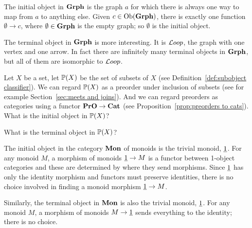\documentclass[CT4S-EN-RU]{subfiles}
\begin{document}
\begin{exampleRUS}\label{ex:universal obs in set}
\end{exampleRUS}

\begin{exampleENG}
The initial object in ${\mathbf{Grph}}$ is the graph $a$ for which there is always one way to map from $a$ to anything else. Given $c\in\textnormal{Ob}({\mathbf{Grph}})$, there is exactly one function $\emptyset\to c$, where $\emptyset\in{\mathbf{Grph}}$ is the empty graph; so $\emptyset$ is the initial object.

The terminal object in ${\mathbf{Grph}}$ is more interesting. It is ${\mathcal{L} oop}$, the graph with one vertex and one arrow. In fact there are infinitely many terminal objects in ${\mathbf{Grph}}$, but all of them are isomorphic to ${\mathcal{L} oop}$. 
\end{exampleENG}

\begin{exampleRUS}
\end{exampleRUS}

\begin{exerciseENG}
Let $X$ be a set, let ${\mathbb P}(X)$ be the set of subsets of $X$ (see Definition~\ref{def:subobject classifier}). We can regard ${\mathbb P}(X)$ as a preorder under inclusion of subsets (see for example Section~\ref{sec:meets and joins}). And we can regard preorders as categories using a functor ${\mathbf{PrO}}\rightarrow{\mathbf{Cat}}$ (see Proposition~\ref{prop:preorders to cats}).
\sexc What is the initial object in ${\mathbb P}(X)$?
\item What is the terminal object in ${\mathbb P}(X)$? 
\endsexc
\end{exerciseENG}

\begin{exerciseRUS}
\end{exerciseRUS}

\begin{exampleENG}\label{ex:initial monoid terminal monoid}
The initial object in the category ${\mathbf{Mon}}$ of monoids is the trivial monoid, $\underline{1}$. For any monoid $M$, a morphism of monoids $\underline{1}\rightarrow M$ is a functor between 1-object categories and these are determined by where they send morphisms. Since $\underline{1}$ has only the identity morphism and functors must preserve identities, there is no choice involved in finding a monoid morphism $\underline{1}\rightarrow M$.

Similarly, the terminal object in ${\mathbf{Mon}}$ is also the trivial monoid, $\underline{1}$. For any monoid $M$, a morphism of monoids $M\rightarrow\underline{1}$ sends everything to the identity; there is no choice.
\end{exampleENG}
\end{document}
